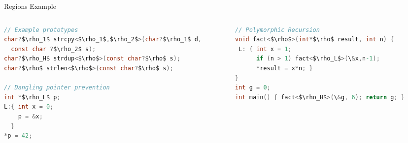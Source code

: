 \documentclass[aspectratio=169]{beamer}
\begin{document}
\begin{frame}[fragile]{Regions Example}
\footnotesize{
  \begin{columns}[T]
    \begin{column}{0.48\textwidth}
\begin{lstlisting}[language=C,mathescape,basicstyle={\scriptsize\ttfamily}]
// Example prototypes
char?$\rho_1$ strcpy<$\rho_1$,$\rho_2$>(char?$\rho_1$ d,
  const char ?$\rho_2$ s);
char?$\rho_H$ strdup<$\rho$>(const char?$\rho$ s);
char?$\rho$ strlen<$\rho$>(const char?$\rho$ s);

// Dangling pointer prevention
int *$\rho_L$ p;
L:{ int x = 0;
    p = &x;
  }
*p = 42;
\end{lstlisting}
    \end{column}
%

    \begin{column}{0.48\textwidth}
\begin{lstlisting}[language=C,mathescape,basicstyle={\scriptsize\ttfamily}]
// Polymorphic Recursion
void fact<$\rho$>(int*$\rho$ result, int n) {
 L: { int x = 1;
      if (n > 1) fact<$\rho_L$>(\&x,n-1);
      *result = x*n; }
}
int g = 0;
int main() { fact<$\rho_H$>(\&g, 6); return g; }
\end{lstlisting}
    \end{column}
    \end{columns}
}
%
\end{frame}
\end{document}
